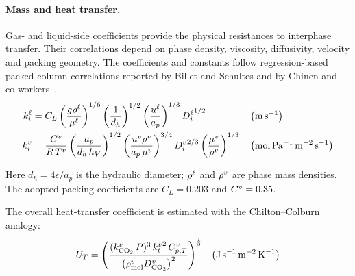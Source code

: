 \paragraph{Mass and heat transfer.}
Gas- and liquid-side coefficients provide the physical resistances to interphase transfer.
Their correlations depend on phase density, viscosity, diffusivity, velocity and packing geometry.
The coefficients and constants follow regression-based packed-column correlations reported by Billet and Schultes and by Chinen and co-workers~\cite{Billet1999,Chinen2018}.
\begin{align}
k^{\liq}_i &= C_L
\left(\frac{g\rho^{\liq}}{\mu^{\liq}}\right)^{1/6}
\left(\frac{1}{d_h}\right)^{1/2}
\left(\frac{u^{\liq}}{a_p}\right)^{1/3}
{D_i^{\liq}}^{1/2}
&& \left(\unit{m\,s^{-1}}\right)\\
k^{\vap}_i &= \frac{C^{\vap}}{R\,T^{\vap}}
\left(\frac{a_p}{d_h\,h_V}\right)^{1/2}
\left(\frac{u^{\vap}\rho^{\vap}}{a_p\,\mu^{\vap}}\right)^{3 / 4}
{D_i^{\vap}}^{2 / 3}
\left(\frac{\mu^{\vap}}{\rho^{\vap}}\right)^{1 / 3}
&& \left(\unit{mol\,Pa^{-1}\,m^{-2}\,s^{-1}}\right)
\end{align}

Here \(d_h=4\epsilon/a_p\) is the hydraulic diameter; \(\rho^{\ell}\) and \(\rho^{v}\) are phase mass densities.
The adopted packing coefficients are \(C_L=0.203\) and \(C^{v}=0.35\).


The overall heat-transfer coefficient is estimated with the Chilton--Colburn analogy:
\begin{align}
U_T = \left(\frac{(k^{\vap}_{\COtwo}\,P)^3\,{k_{t}^{\vap}}^{2}\,C^{\vap}_{p,T}}{\left(\rho^{\vap}_{\text{mol}}D^{\vap}_{\COtwo}\right)^2}\right)^{\frac{1}{3}}
&& \left(\unit{J\,s^{-1}\,m^{-2}\,K^{-1}}\right)
\end{align}

